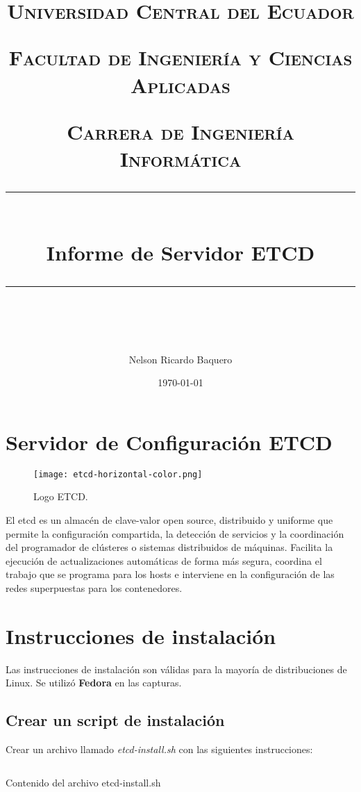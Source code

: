 \documentclass[11pt]{scrartcl} %
\title{	
	\normalfont\normalsize
	\textsc{Universidad Central del Ecuador}

	\textsc{Facultad de Ingeniería y Ciencias Aplicadas}

	\textsc{Carrera de Ingeniería Informática}
	\vspace{6pt} %
	\rule{\linewidth}{0.5pt}\\ %
	\vspace{20pt} %
	{\huge Informe de Servidor ETCD}\\ %
	\vspace{12pt} %
	\rule{\linewidth}{2pt}\\ %
	\vspace{12pt} %
}
\author{\LARGE Nelson Ricardo Baquero} %
\date{\normalsize\today} %
\begin{document}
\maketitle %

\section{Servidor de Configuración ETCD}

\begin{figure}[h] %
	\centering
	\texttt{[image: etcd-horizontal-color.png]} %
	\caption{Logo ETCD.}
\end{figure}

El etcd es un almacén de clave-valor open source, distribuido y uniforme que permite la configuración compartida, la detección de servicios y la coordinación del programador de clústeres o sistemas distribuidos de máquinas. Facilita la ejecución de actualizaciones automáticas de forma más segura, coordina el trabajo que se programa para los hosts e interviene en la configuración de las redes superpuestas para los contenedores.


\section{Instrucciones de instalación}

Las instrucciones de instalación son válidas para la mayoría de distribuciones de Linux.
Se utilizó \textbf{Fedora} en las capturas.

\subsection{Crear un script de instalación}

Crear un archivo llamado \emph{etcd-install.sh} con las siguientes instrucciones:

\begin{listing}[H]
	\inputminted[frame=lines,numbers=left]{bash}{etcd-install.sh}
	\caption{Contenido del archivo etcd-install.sh}
	\label{lst:install-script}
\end{listing}
\end{document}
